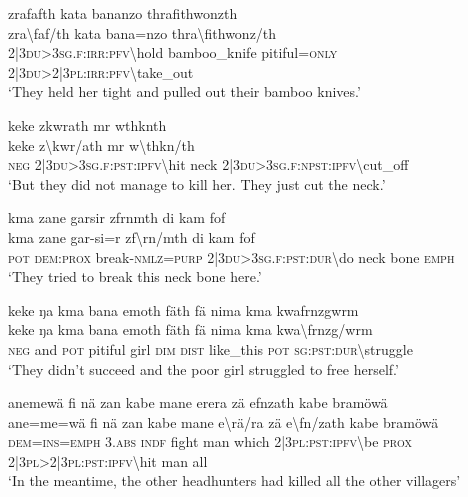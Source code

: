 \ea\label{ex:5:a5647}
zrafafth kata bananzo thrafithwonzth\\
\gll zra{\textbackslash}faf/th	kata	bana=nzo	thra{\textbackslash}fithwonz/th\\
     2|3\textsc{du}>3\textsc{sg}.\textsc{f}:\textsc{irr}:\textsc{pfv}{\textbackslash}hold	bamboo\_knife	pitiful=\textsc{only}	2|3\textsc{du}>2|3\textsc{pl}:\textsc{irr}:\textsc{pfv}{\textbackslash}take\_out\\
\glt `They held her tight and pulled out their bamboo knives.'
\z

\ea\label{ex:5:a1571}
keke zkwrath mr wthknth\\
\gll keke	z{\textbackslash}kwr/ath	mr	w{\textbackslash}thkn/th\\
     \textsc{neg}	2|3\textsc{du}>3\textsc{sg}.\textsc{f}:\textsc{pst}:\textsc{ipfv}{\textbackslash}hit	neck	2|3\textsc{du}>3\textsc{sg}.\textsc{f}:\textsc{npst}:\textsc{ipfv}{\textbackslash}cut\_off\\
\glt `But they did not manage to kill her. They just cut the neck.'
\z

\ea\label{ex:5:a1573}
kma zane garsir zfrnmth di kam fof\\
\gll kma	zane	gar-si=r	zf{\textbackslash}rn/mth	di	kam	fof\\
     \textsc{pot}	\textsc{dem}:\textsc{prox}	break-\textsc{nmlz}=\textsc{purp}	2|3\textsc{du}>3\textsc{sg}.\textsc{f}:\textsc{pst}:\textsc{dur}{\textbackslash}do	neck	bone	\textsc{emph}\\
\glt `They tried to break this neck bone here.'
\z

\ea\label{ex:5:a1574}
keke ŋa kma bana emoth fäth fä nima kma kwafrnzgwrm\\
\gll keke	ŋa	kma	bana	emoth	fäth	fä	nima	kma	kwa{\textbackslash}frnzg/wrm\\
     \textsc{neg}	and	\textsc{pot}	pitiful	girl	\textsc{dim}	\textsc{dist}	like\_this	\textsc{pot}	\textsc{sg}:\textsc{pst}:\textsc{dur}{\textbackslash}struggle\\
\glt `They didn't succeed and the poor girl struggled to free herself.'
\z

\ea\label{ex:5:a1575}
anemewä fi nä zan kabe mane erera zä efnzath kabe bramöwä\\
\gll ane=me=wä	fi	nä	zan	kabe	mane	e{\textbackslash}rä/ra	zä	e{\textbackslash}fn/zath	kabe	bramöwä\\
     \textsc{dem}=\textsc{ins}=\textsc{emph}	3.\textsc{abs}	\textsc{indf}	fight	man	which	2|3\textsc{pl}:\textsc{pst}:\textsc{ipfv}{\textbackslash}be	\textsc{prox}	2|3\textsc{pl}>2|3\textsc{pl}:\textsc{pst}:\textsc{ipfv}{\textbackslash}hit	man	all\\
\glt `In the meantime, the other headhunters had killed all the other villagers'
\z

